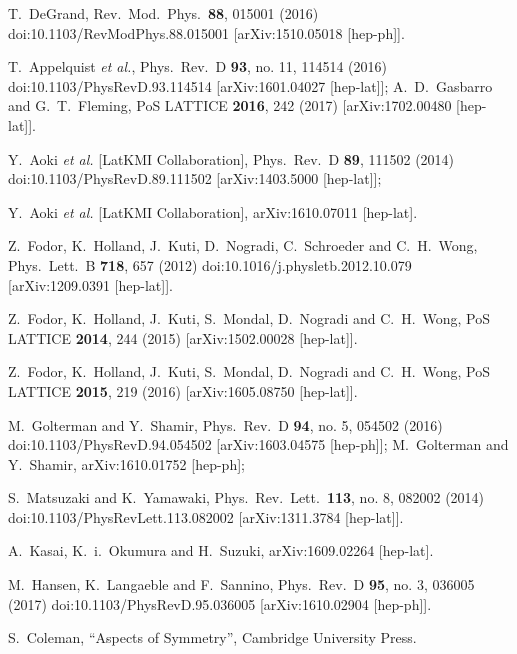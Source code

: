 \documentclass[a4paper,11pt]{article}
\begin{document}
\vspace{1.0cm}
\appendix
\appendix
\begin{thebibliography}{99}
T.~DeGrand,
Rev.\ Mod.\ Phys.\  {\bf 88}, 015001 (2016)
doi:10.1103/RevModPhys.88.015001
[arXiv:1510.05018 [hep-ph]].

T.~Appelquist {\it et al.},
Phys.\ Rev.\ D {\bf 93}, no. 11, 114514 (2016)
doi:10.1103/PhysRevD.93.114514
[arXiv:1601.04027 [hep-lat]];
A.~D.~Gasbarro and G.~T.~Fleming,
PoS LATTICE {\bf 2016}, 242 (2017)
[arXiv:1702.00480 [hep-lat]].

Y.~Aoki {\it et al.} [LatKMI Collaboration],
Phys.\ Rev.\ D {\bf 89}, 111502 (2014)
doi:10.1103/PhysRevD.89.111502
[arXiv:1403.5000 [hep-lat]];
 
Y.~Aoki {\it et al.} [LatKMI Collaboration],
arXiv:1610.07011 [hep-lat].

Z.~Fodor, K.~Holland, J.~Kuti, D.~Nogradi, C.~Schroeder and C.~H.~Wong,
Phys.\ Lett.\ B {\bf 718}, 657 (2012)
doi:10.1016/j.physletb.2012.10.079
[arXiv:1209.0391 [hep-lat]].

Z.~Fodor, K.~Holland, J.~Kuti, S.~Mondal, D.~Nogradi and C.~H.~Wong,
PoS LATTICE {\bf 2014}, 244 (2015)
[arXiv:1502.00028 [hep-lat]].
  
Z.~Fodor, K.~Holland, J.~Kuti, S.~Mondal, D.~Nogradi and C.~H.~Wong,
PoS LATTICE {\bf 2015}, 219 (2016)
[arXiv:1605.08750 [hep-lat]].

M.~Golterman and Y.~Shamir,
Phys.\ Rev.\ D {\bf 94}, no. 5, 054502 (2016)
doi:10.1103/PhysRevD.94.054502
[arXiv:1603.04575 [hep-ph]];
M.~Golterman and Y.~Shamir,
arXiv:1610.01752 [hep-ph];

S.~Matsuzaki and K.~Yamawaki,
Phys.\ Rev.\ Lett.\  {\bf 113}, no. 8, 082002 (2014)
doi:10.1103/PhysRevLett.113.082002
[arXiv:1311.3784 [hep-lat]].

A.~Kasai, K.~i.~Okumura and H.~Suzuki,
arXiv:1609.02264 [hep-lat].

M.~Hansen, K.~Langaeble and F.~Sannino,
Phys.\ Rev.\ D {\bf 95}, no. 3, 036005 (2017)
doi:10.1103/PhysRevD.95.036005
[arXiv:1610.02904 [hep-ph]].

S.~Coleman, ``Aspects of Symmetry'', Cambridge University Press.


\end{thebibliography}
\end{document}
